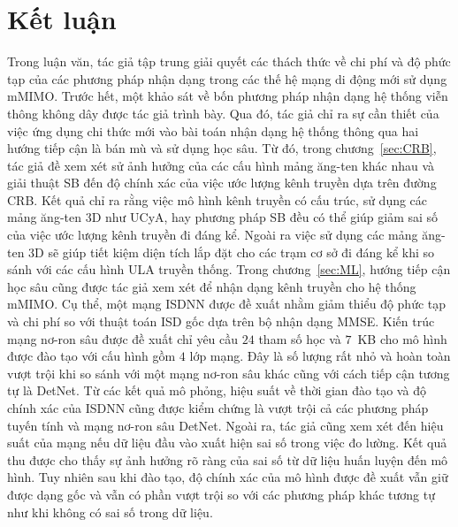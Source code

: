 \clearpage
{}

\chapter*{Kết luận}

Trong luận văn, tác giả tập trung giải quyết các thách thức về chi phí và độ phức tạp của các phương pháp nhận dạng trong các thế hệ mạng di động mới sử dụng mMIMO. Trước hết, một khảo sát về bốn phương pháp nhận dạng hệ thống viễn thông không dây được tác giả trình bày. Qua đó, tác giả chỉ ra sự cần thiết của việc ứng dụng chi thức mới vào bài toán nhận dạng hệ thống thông qua hai hướng tiếp cận là bán mù và sử dụng học sâu. 
Từ đó, trong chương~\ref{sec:CRB}, tác giả đề xem xét sử ảnh hưởng của các cấu hình mảng ăng-ten khác nhau và giải thuật SB đến độ chính xác của việc ước lượng kênh truyền dựa trên đường CRB. Kết quả chỉ ra rằng việc mô hình kênh truyền có cấu trúc, sử dụng các mảng ăng-ten 3D như UCyA, hay phương pháp SB đều có thể giúp giảm sai số của việc ước lượng kênh truyền đi đáng kể. Ngoài ra việc sử dụng các mảng ăng-ten 3D sẽ giúp tiết kiệm diện tích lắp đặt cho các trạm cơ sở đi đáng kể khi so sánh với các cấu hình ULA truyền thống.
Trong chương~\ref{sec:ML}, hướng tiếp cận học sâu cũng được tác giả xem xét để nhận dạng kênh truyền cho hệ thống mMIMO. Cụ thể, một mạng ISDNN được đề xuất nhằm giảm thiểu độ phức tạp và chi phí so với thuật toán ISD gốc dựa trên bộ nhận dạng MMSE. Kiến trúc mạng nơ-ron sâu được đề xuất chỉ yêu cầu $24$ tham số học và $7$~KB cho mô hình được đào tạo với cấu hình gồm $4$ lớp mạng. Đây là số lượng rất nhỏ và hoàn toàn vượt trội khi so sánh với một mạng nơ-ron sâu khác cũng với cách tiếp cận tương tự là DetNet. Từ các kết quả mô phỏng, hiệu suất về thời gian đào tạo và độ chính xác của ISDNN cũng được kiểm chứng là vượt trội cả các phương pháp tuyến tính và mạng nơ-ron sâu DetNet. Ngoài ra, tác giả cũng xem xét đến hiệu suất của mạng nếu dữ liệu đầu vào xuất hiện sai số trong việc đo lường. Kết quả thu được cho thấy sự ảnh hưởng rõ ràng của sai số từ dữ liệu huấn luyện đến mô hình. Tuy nhiên sau khi đào tạo, độ chính xác của mô hình được đề xuất vẫn giữ được dạng gốc và vẫn có phần vượt trội so với các phương pháp khác tương tự như khi không có sai số trong dữ liệu. 

